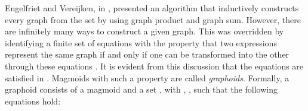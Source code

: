 \documentclass[runningheads,a4paper]{llncs}
\newcommand{\qq}{\qquad}
\begin{document}
Engelfriet and Vereijken, in \cite{EV},  presented an algorithm that inductively constructs every graph  from the set  by using graph product and graph sum.  However, there are infinitely many ways to construct a given graph. This was overridden  by identifying a finite set  of equations  with the property that two expressions represent the same graph if and only if one can be transformed into the other through these equations \cite{BK1}. It is evident from this discussion that the equations  are satisfied in . Magmoids with such a property are called \emph{graphoids}. Formally, a graphoid  consists of a magmoid  and a set , with , ,  such that the following equations hold:\\
\begin{minipage}[b]{70pt}
  \end{minipage}  \begin{minipage}[b]{270pt}
\end{minipage}\\
\begin{minipage}[b]{170pt}
  \end{minipage}\qq\quad  \begin{minipage}[b]{140pt}
\end{minipage}\\
\begin{minipage}[b]{120pt}
  \end{minipage}\qq\quad  \begin{minipage}[b]{180pt}
\end{minipage}\\
\begin{minipage}[r]{300pt}

\end{minipage}\\
\begin{minipage}[b]{170pt}
  \end{minipage} \qq  \begin{minipage}[b]{140pt}
\end{minipage}\\
\begin{minipage}[b]{120pt}
  \end{minipage} \qq  \begin{minipage}[b]{180pt}
\end{minipage}\\
\begin{minipage}[b]{300pt}

\end{minipage}\\
\end{document}
